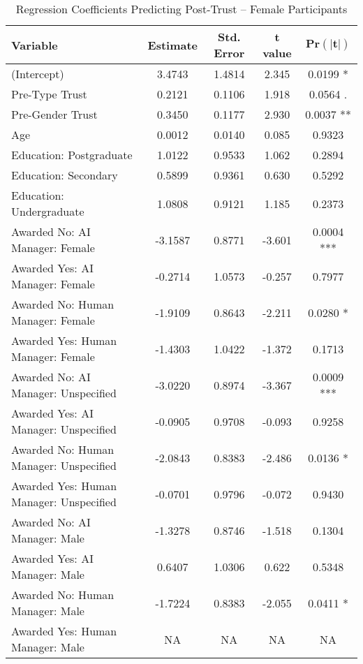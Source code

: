 \begin{table}[ht]
    \centering
    \caption{Regression Coefficients Predicting Post-Trust -- Female Participants}
    \begin{tabular}{lcccc}
        \toprule
        \textbf{Variable} & \textbf{Estimate} & \textbf{Std. Error} & \textbf{t value} & 
        $\mathbf{\text{Pr}(|t|)}$
        \\
        \midrule
        (Intercept) & 3.4743  & 1.4814  & 2.345  & 0.0199 *  \\
        Pre-Type Trust & 0.2121  & 0.1106  & 1.918  & 0.0564 .  \\
        Pre-Gender Trust & 0.3450  & 0.1177  & 2.930  & 0.0037 **  \\
        Age & 0.0012  & 0.0140  & 0.085  & 0.9323  \\
        Education: Postgraduate & 1.0122  & 0.9533  & 1.062  & 0.2894  \\
        Education: Secondary & 0.5899  & 0.9361  & 0.630  & 0.5292  \\
        Education: Undergraduate & 1.0808  & 0.9121  & 1.185  & 0.2373  \\
        Awarded No: AI Manager: Female & -3.1587  & 0.8771  & -3.601  & 0.0004 ***  \\
        Awarded Yes: AI Manager: Female & -0.2714  & 1.0573  & -0.257  & 0.7977  \\
        Awarded No: Human Manager: Female & -1.9109  & 0.8643  & -2.211  & 0.0280 *  \\
        Awarded Yes: Human Manager: Female & -1.4303  & 1.0422  & -1.372  & 0.1713  \\
        Awarded No: AI Manager: Unspecified & -3.0220  & 0.8974  & -3.367  & 0.0009 ***  \\
        Awarded Yes: AI Manager: Unspecified & -0.0905  & 0.9708  & -0.093  & 0.9258  \\
        Awarded No: Human Manager: Unspecified & -2.0843  & 0.8383  & -2.486  & 0.0136 *  \\
        Awarded Yes: Human Manager: Unspecified & -0.0701  & 0.9796  & -0.072  & 0.9430  \\
        Awarded No: AI Manager: Male & -1.3278  & 0.8746  & -1.518  & 0.1304  \\
        Awarded Yes: AI Manager: Male & 0.6407  & 1.0306  & 0.622  & 0.5348  \\
        Awarded No: Human Manager: Male & -1.7224  & 0.8383  & -2.055  & 0.0411 *  \\
        Awarded Yes: Human Manager: Male & NA  & NA  & NA  & NA  \\

\end{tabular}
\end{table}
